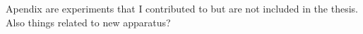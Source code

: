 Apendix are experiments that I contributed to but are not included in the thesis. Also things related to new apparatus?


